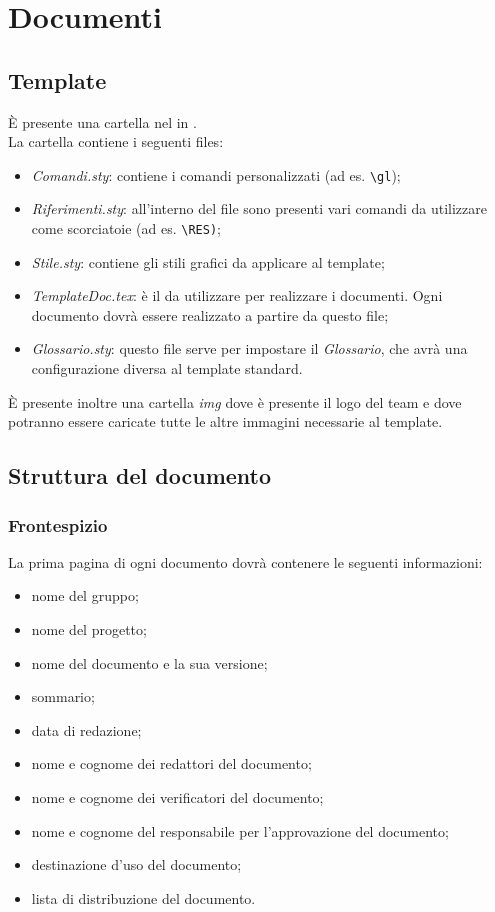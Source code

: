 \section{Documenti}
	\subsection{Template}
		È presente una cartella nel  in . \\
		La cartella contiene i seguenti files:
		\begin{itemize}
			\item \textit{Comandi.sty}: contiene i comandi personalizzati (ad es. \texttt {\textbackslash gl});
			\item \textit{Riferimenti.sty}: all'interno del file sono presenti vari comandi da utilizzare come scorciatoie (ad es. \texttt{\textbackslash RES)};
			\item \textit{Stile.sty}: contiene gli stili grafici da applicare al template;
			\item \textit{TemplateDoc.tex}: è il  da utilizzare per realizzare i documenti. Ogni documento dovrà essere realizzato a partire da questo file;
			\item \textit{Glossario.sty}: questo file serve per impostare il \textit{Glossario}, che avrà una configurazione diversa al template standard. %
		\end{itemize}
		È presente inoltre una cartella \textit{img} dove è presente il logo del team e dove potranno essere caricate tutte le altre immagini necessarie al template. \\
	\subsection{Struttura del documento}
		\subsubsection{Frontespizio}
		La prima pagina di ogni documento dovrà contenere le seguenti informazioni:
		\begin{itemize}
			\item nome del gruppo;
			\item nome del progetto;
			\item nome del documento e la sua versione;
			\item sommario;
			\item data di redazione;
			\item nome e cognome dei redattori del documento;
			\item nome e cognome dei verificatori del documento;
			\item nome e cognome del responsabile per l'approvazione del documento;
			\item destinazione d'uso del documento;
			\item lista di distribuzione del documento.
		\end{itemize}
